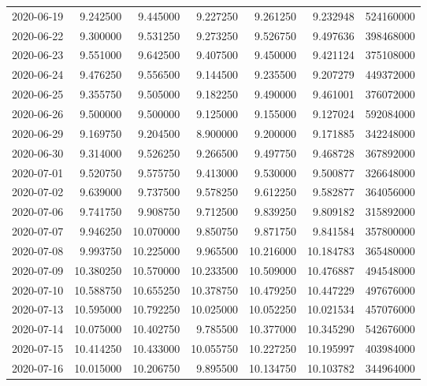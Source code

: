 \begin{tabular}{lrrrrrr}
2020-06-19 &    9.242500 &    9.445000 &    9.227250 &    9.261250 &    9.232948 &   524160000 \\
2020-06-22 &    9.300000 &    9.531250 &    9.273250 &    9.526750 &    9.497636 &   398468000 \\
2020-06-23 &    9.551000 &    9.642500 &    9.407500 &    9.450000 &    9.421124 &   375108000 \\
2020-06-24 &    9.476250 &    9.556500 &    9.144500 &    9.235500 &    9.207279 &   449372000 \\
2020-06-25 &    9.355750 &    9.505000 &    9.182250 &    9.490000 &    9.461001 &   376072000 \\
2020-06-26 &    9.500000 &    9.500000 &    9.125000 &    9.155000 &    9.127024 &   592084000 \\
2020-06-29 &    9.169750 &    9.204500 &    8.900000 &    9.200000 &    9.171885 &   342248000 \\
2020-06-30 &    9.314000 &    9.526250 &    9.266500 &    9.497750 &    9.468728 &   367892000 \\
2020-07-01 &    9.520750 &    9.575750 &    9.413000 &    9.530000 &    9.500877 &   326648000 \\
2020-07-02 &    9.639000 &    9.737500 &    9.578250 &    9.612250 &    9.582877 &   364056000 \\
2020-07-06 &    9.741750 &    9.908750 &    9.712500 &    9.839250 &    9.809182 &   315892000 \\
2020-07-07 &    9.946250 &   10.070000 &    9.850750 &    9.871750 &    9.841584 &   357800000 \\
2020-07-08 &    9.993750 &   10.225000 &    9.965500 &   10.216000 &   10.184783 &   365480000 \\
2020-07-09 &   10.380250 &   10.570000 &   10.233500 &   10.509000 &   10.476887 &   494548000 \\
2020-07-10 &   10.588750 &   10.655250 &   10.378750 &   10.479250 &   10.447229 &   497676000 \\
2020-07-13 &   10.595000 &   10.792250 &   10.025000 &   10.052250 &   10.021534 &   457076000 \\
2020-07-14 &   10.075000 &   10.402750 &    9.785500 &   10.377000 &   10.345290 &   542676000 \\
2020-07-15 &   10.414250 &   10.433000 &   10.055750 &   10.227250 &   10.195997 &   403984000 \\
2020-07-16 &   10.015000 &   10.206750 &    9.895500 &   10.134750 &   10.103782 &   344964000 \\

\end{tabular}
